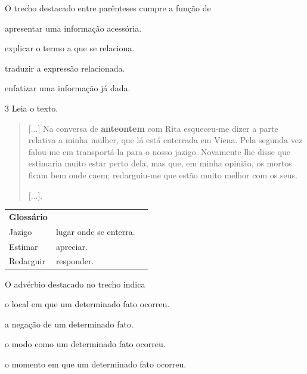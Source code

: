O trecho destacado entre parênteses cumpre a função de

\begin{minipage}{.5\textwidth}
\begin{escolha}
\item apresentar uma informação acessória.

\item explicar o termo a que se relaciona.

\item traduzir a expressão relacionada.

\item enfatizar uma informação já dada.
\end{escolha}
\end{minipage}

\pagebreak
\num{3} Leia o texto.

\begin{quote}
{[}...{]} Na conversa de \textbf{anteontem} com Rita esqueceu-me dizer
a parte relativa a minha mulher, que lá está enterrada em Viena. Pela
segunda vez falou-me em transportá-la para o nosso jazigo. Novamente lhe
disse que estimaria muito estar perto dela, mas que, em minha opinião,
os mortos ficam bem onde caem; redarguiu-me que estão muito melhor com
os seus.

{[}...{]}.

\end{quote}

\begin{tabular}{lll}
\textbf{Glossário} & \mbox{}\\
Jazigo & lugar onde se enterra.\\
Estimar & apreciar.\\
Redarguir & responder.\\
\end{tabular}\bigskip

O advérbio destacado no trecho indica

\begin{escolha}
\item o local em que um determinado fato ocorreu.

\item a negação de um determinado fato.

\item o modo como um determinado fato ocorreu.

\item o momento em que um determinado fato ocorreu.
\end{escolha}

